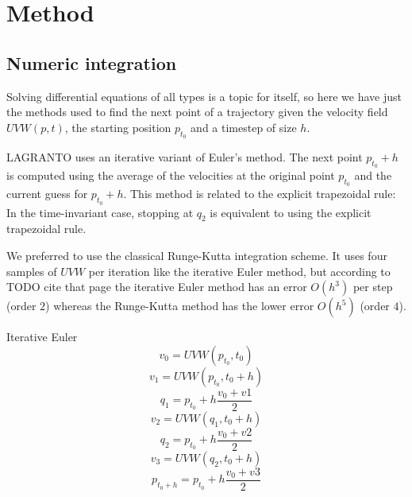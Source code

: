 \chapter{Method}

\section{Numeric integration}\label{sec:integrator}
Solving differential equations of all types is a topic for itself, so here we have just the methods used to find the next point of a trajectory given the velocity field $UVW(p,t)$, the starting position $p_{t_0}$ and a timestep of size $h$.

LAGRANTO uses an iterative variant of Euler's method. The next point $p_{t_0}+h$ is computed using the average of the velocities at the original point $p_{t_0}$ and the current guess for $p_{t_0}+h$. This method is related to the explicit trapezoidal rule: In the time-invariant case, stopping at $q_2$ is equivalent to using the explicit trapezoidal rule.

We preferred to use the classical Runge-Kutta integration scheme. It uses four samples of $UVW$ per iteration like the iterative Euler method, but according to {TODO cite that page} the iterative Euler method has an error $O(h^3)$ per step (order $2$) whereas the Runge-Kutta method has the lower error $O(h^5)$ (order $4$).


Iterative Euler
\begin{equation}
	v_0 = UVW(p_{t_0}, t_0)
\end{equation}
\begin{equation}
	v_1 = UVW(p_{t_0}, t_0 + h)
\end{equation}
\begin{equation}
	q_1 = p_{t_0} + h \frac{ v_0  + v1}{2}
\end{equation}
\begin{equation}
	v_2 = UVW(q_1, t_0 + h)
\end{equation}
\begin{equation}
	q_2 = p_{t_0} + h \frac{ v_0  + v2}{2}
\end{equation}
\begin{equation}
	v_3 = UVW(q_2, t_0 + h)
\end{equation}
\begin{equation}
	p_{t_0 + h} = p_{t_0} + h \frac{ v_0  + v3}{2}
\end{equation}

